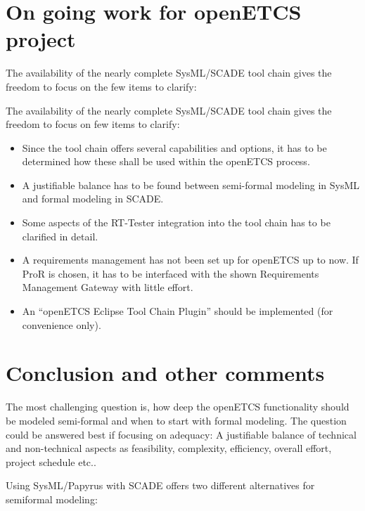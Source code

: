 \section{On going work for openETCS project}

The availability of the nearly complete SysML/SCADE tool chain gives the freedom to focus on the few items to clarify: 

The availability of the nearly complete SysML/SCADE tool chain gives the freedom to focus on few items to clarify: 

\begin{itemize}
	\item Since the tool chain offers several capabilities and options, it has to be determined how these shall be used within the openETCS process. 
	\item A justifiable balance has to be found between semi-formal modeling in SysML and formal modeling in SCADE. 
	\item Some aspects of the RT-Tester integration into the tool chain has to be clarified in detail. 
	\item A requirements management has not been set up for openETCS up to now. If ProR is chosen, it has to be interfaced with the shown Requirements Management Gateway with little effort. 
	\item An "`openETCS Eclipse Tool Chain Plugin"' should be implemented (for convenience only).  
\end{itemize}


\section{Conclusion and other comments}

The most challenging question is, how deep the openETCS functionality should be modeled semi-formal and when to start with formal modeling. 
The question could be answered best if focusing on adequacy: A justifiable balance of technical and non-technical aspects as feasibility, complexity, efficiency,  overall effort,  project schedule etc..

Using SysML/Papyrus with SCADE offers two different alternatives for semiformal modeling:


